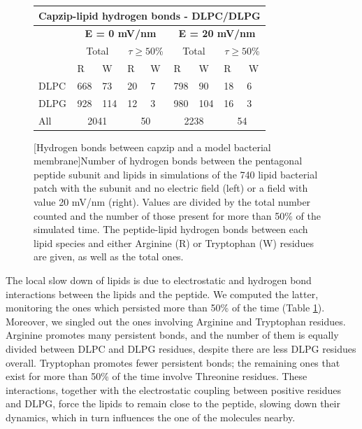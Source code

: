 \begin{figure}[p!]
\vspace{0.5cm}

\centering
 \def\arraystretch{1.6}
\begin{tabular}{l|llll|llll}
\multicolumn{9}{c}{\textbf{Capzip-lipid hydrogen bonds - DLPC/DLPG}} \\
\hline
& \multicolumn{4}{c|}{\textbf{E = 0 mV/nm}} & \multicolumn{4}{c}{\textbf{E = 20 mV/nm}} \\
\hline
 & \multicolumn{2}{c}{Total} & \multicolumn{2}{c|}{$\displaystyle\tau \ge 50$\%}  & \multicolumn{2}{c}{Total} & \multicolumn{2}{c}{$\displaystyle\tau \ge 50$\%} \\
\hline
  & \multicolumn{1}{l}{R} & \multicolumn{1}{l}{W} & \multicolumn{1}{l}{R} & \multicolumn{1}{l|}{W} & \multicolumn{1}{l}{R} & \multicolumn{1}{l}{W} & \multicolumn{1}{l}{R} & \multicolumn{1}{c}{W} \\
 {DLPC} & 668 & 73 & 20 & 7 & 798 & 90 & 18 & 6 \\
 {DLPG} & 928 & 114 & 12 & 3 & 980 & 104 & 16 & 3 \\
 \hline
 {All} & \multicolumn{2}{c}{2041} & \multicolumn{2}{c|}{50} & \multicolumn{2}{c}{2238} & \multicolumn{2}{c}{54} \\
\hline
 \end{tabular}
[Hydrogen bonds between capzip and a model bacterial membrane]{Number of hydrogen bonds between the pentagonal peptide subunit and lipids in simulations of the 740 lipid bacterial patch with the subunit and no electric field (left) or a field with value 20 mV/nm (right). Values are divided by the total number counted and the number of those present for more than 50\% of the simulated time. The peptide-lipid hydrogen bonds between each lipid species and either Arginine (R) or Tryptophan (W) residues are given, as well as the total ones.}
\label{table:hb_pr_lip}
\end{figure}

The local slow down of lipids is due to electrostatic and hydrogen bond interactions between the lipids and the peptide. We computed the latter, monitoring the ones which persisted more than 50\% of the time (Table \ref{table:hb_pr_lip}). Moreover, we singled out the ones involving Arginine and Tryptophan residues.
%
Arginine promotes many persistent bonds, and the number of them is equally divided between DLPC and DLPG residues, despite there are less DLPG residues overall. Tryptophan promotes fewer persistent bonds; the remaining ones that exist for more than 50\% of the time involve Threonine residues.
%
These interactions, together with the electrostatic coupling between positive residues and DLPG, force the lipids to remain close to the peptide, slowing down their dynamics, which in turn influences the one of the molecules nearby.

